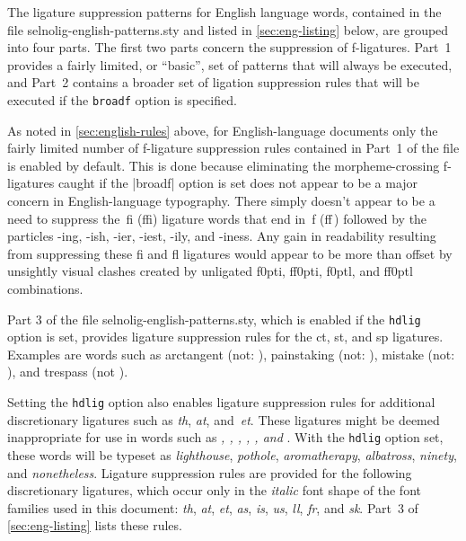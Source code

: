 \documentclass[11pt]{article}
\newcommand{\pkg}[1]{\textsf{#1}}
\newcommand{\opt}[1]{\texttt{#1}}
\begin{document}
The ligature suppression patterns for English language words, contained in the file \pkg{selnolig-english-patterns.sty} and listed in \cref{sec:eng-listing} below, are grouped into four parts. The first two parts concern the suppression of f-ligatures. Part~1 provides a fairly limited, or \enquote{basic}, set of patterns that will always be executed, and Part~2 contains a broader set of ligation suppression rules that will be executed if the \opt{broadf} option is specified. 

As noted in \cref{sec:english-rules} above, for English-language documents only the fairly limited number of f-ligature suppression rules contained in Part~1 of the file is enabled by default. This is done because eliminating the morpheme-crossing f-ligatures caught if the |broadf| option is set does not appear to be a major concern in English-language typography. There simply doesn't appear to be a need to suppress the~fi (ffi) ligature words that end in~f (ff\,) followed by the particles -ing, -ish, -ier, -iest, -ily, and -iness. Any gain in readability resulting from suppressing these fi and fl ligatures would appear to be more than offset by unsightly visual clashes created by unligated f\kern0pti, ff\kern0pti, f\kern0ptl, and ff\kern0ptl combinations.


Part 3 of the file \pkg{selnolig-english-patterns.sty}, which is enabled if the \opt{hdlig} option is set, provides ligature suppression rules for the ct, st, and sp ligatures. Examples are words such as arctangent (not: ), painstaking (not: ), mistake (not: ), and trespass (not ). 

Setting the \opt{hdlig} option also enables ligature suppression rules for additional discretionary ligatures such as \emph{th}, \emph{at}, and~\emph{et}. These ligatures might be deemed inappropriate for use in words such as \emph{, , , , , \emph{and} }. With the \opt{hdlig} option set, these words will be typeset as \emph{lighthouse}, \emph{pothole}, \emph{aromatherapy}, \emph{albatross}, \emph{ninety}, and \emph{nonetheless}. Ligature suppression rules are provided for the following discretionary ligatures, which occur only in the \emph{italic} font shape of the font families used in this document: \emph{th}, \emph{at}, \emph{et}, \emph{as}, \emph{is}, \emph{us}, \emph{ll}, \emph{fr}, and {\ebg \emph{sk}}. Part~3 of \cref{sec:eng-listing} lists these rules.
\end{document}
